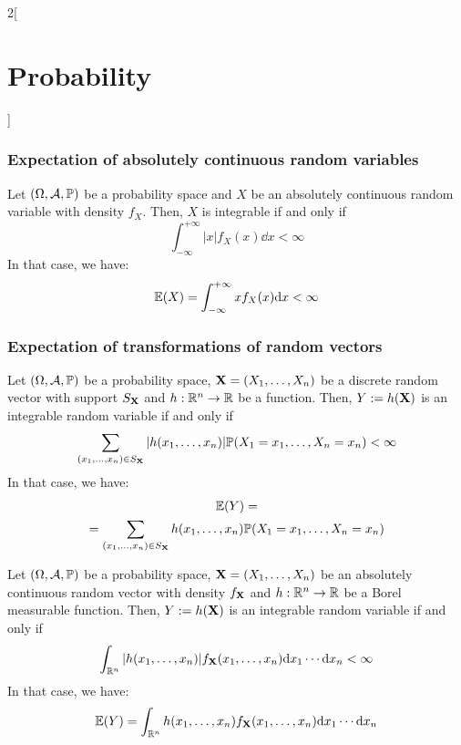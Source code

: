 \documentclass[../../../main.tex]{subfiles}
\begin{document}
\begin{multicols}{2}[\section{Probability}]
    \subsubsection{Expectation of absolutely continuous random variables}
    \begin{theorem}
        Let $(\Omega,\mathcal{A},\mathbb{P})$ be a probability space and $X$ be an absolutely continuous random variable with density $f_X$. Then, $X$ is integrable if and only if $$\int_{-\infty}^{+\infty}|x|f_X(x)\dd x<\infty$$
        In that case, we have: $$\mathbb{E}(X)=\int_{-\infty}^{+\infty}xf_X(x)\dd x<\infty$$
    \end{theorem}
    \subsubsection{Expectation of transformations of random vectors}
    \begin{prop}
        Let $(\Omega,\mathcal{A},\mathbb{P})$ be a probability space, $\boldsymbol{\mathrm{X}}=(X_1,\ldots,X_n)$ be a discrete random vector with support $S_{\boldsymbol{\mathrm{X}}}$ and $h:\mathbb{R}^n\rightarrow\mathbb{R}$ be a function. Then, $Y:=h(\boldsymbol{\mathrm{X}})$ is an integrable random variable if and only if $$\sum_{(x_1,\ldots,x_n)\in S_{\boldsymbol{\mathrm{X}}}}|h(x_1,\ldots,x_n)|\mathbb{P}(X_1=x_1,\ldots,X_n=x_n)<\infty$$
        In that case, we have:
        \begin{multline*}
            \mathbb{E}(Y)=\\=\sum_{(x_1,\ldots,x_n)\in S_{\boldsymbol{\mathrm{X}}}}h(x_1,\ldots,x_n)\mathbb{P}(X_1=x_1,\ldots,X_n=x_n)
        \end{multline*}
    \end{prop}
    \begin{prop}
        Let $(\Omega,\mathcal{A},\mathbb{P})$ be a probability space, $\boldsymbol{\mathrm{X}}=(X_1,\ldots,X_n)$ be an absolutely continuous random vector with density $f_{\boldsymbol{\mathrm{X}}}$ and $h:\mathbb{R}^n\rightarrow\mathbb{R}$ be a Borel measurable function. Then, $Y:=h(\boldsymbol{\mathrm{X}})$ is an integrable random variable if and only if $$\int_{\mathbb{R}^n}|h(x_1,\ldots,x_n)|f_{\boldsymbol{\mathrm{X}}}(x_1,\ldots,x_n)\dd x_1\cdots\dd x_n<\infty$$
        In that case, we have:
        $$
            \mathbb{E}(Y)=\int_{\mathbb{R}^n}h(x_1,\ldots,x_n)f_{\boldsymbol{\mathrm{X}}}(x_1,\ldots,x_n)\dd x_1\cdots\dd x_n$$
    \end{prop}

\end{multicols}
\end{document}
